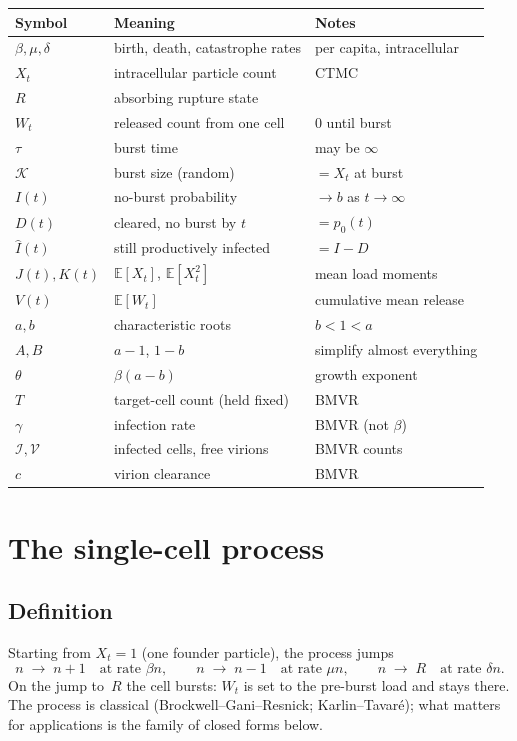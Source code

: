 \documentclass[11pt,a4paper]{article}
\newcommand{\E}{\mathbb{E}}
\newcommand{\xt}{X_t}
\newcommand{\wt}{W_t}
\newcommand{\Ihat}{\widehat{I}}
\newcommand{\Kb}{\mathcal{K}}
\newcommand{\Icell}{\mathcal{I}}
\newcommand{\Vfree}{\mathcal{V}}
\newcommand{\Aa}{A}
\newcommand{\Bb}{B}
\theoremstyle{plain}
\theoremstyle{definition}
\theoremstyle{remark}
\begin{document}
{\small
\renewcommand{\arraystretch}{1.2}
\begin{tabular}{@{}llp{}@{}}
\toprule
Symbol & Meaning & Notes \\
\midrule
$\beta,\mu,\delta$ & birth, death, catastrophe rates & per capita, intracellular \\
$\xt$ & intracellular particle count & CTMC \\
$R$ & absorbing rupture state & \\
$\wt$ & released count from one cell & $0$ until burst \\
$\tau$ & burst time & may be $\infty$ \\
$\Kb$ & burst size (random) & $=\xt$ at burst \\
$I(t)$ & no-burst probability & $\to b$ as $t\to\infty$ \\
$D(t)$ & cleared, no burst by $t$ & $=p_0(t)$ \\
$\Ihat(t)$ & still productively infected & $=I-D$ \\
$J(t),K(t)$ & $\E[\xt]$, $\E[\xt^2]$ & mean load moments \\
$V(t)$ & $\E[\wt]$ & cumulative mean release \\
$a,b$ & characteristic roots & $b<1<a$ \\
$\Aa,\Bb$ & $a-1$, $1-b$ & simplify almost everything \\
$\theta$ & $\beta(a-b)$ & growth exponent \\
$T$ & target-cell count (held fixed) & BMVR \\
$\gamma$ & infection rate & BMVR (not $\beta$) \\
$\Icell,\Vfree$ & infected cells, free virions & BMVR counts \\
$c$ & virion clearance & BMVR \\
\bottomrule
\end{tabular}
}

\section{The single-cell process}

\subsection{Definition}

Starting from $\xt=1$ (one founder particle), the process jumps
\[
n \;\to\; n+1 \quad\text{at rate }\beta n,\qquad
n \;\to\; n-1 \quad\text{at rate }\mu n,\qquad
n \;\to\; R \quad\text{at rate }\delta n.
\]
On the jump to~$R$ the cell bursts: $\wt$ is set to the pre-burst load and stays
there. The process is classical (Brockwell--Gani--Resnick; Karlin--Tavar\'e);
what matters for applications is the family of closed forms below.
\end{document}
